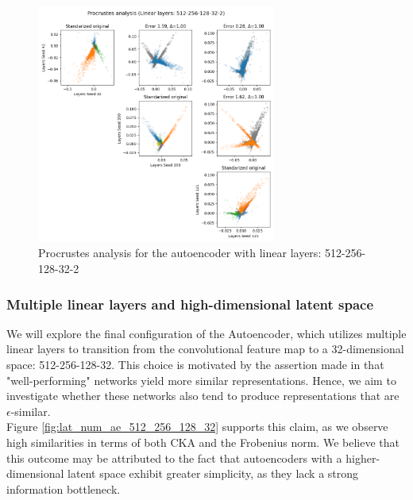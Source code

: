 \documentclass[../main.tex]{subfiles}
\begin{document}
\begin{figure}[ht!]
    \centering
    \includegraphics[width=0.7\textwidth]{figures/rs/sim_ae/procrustes_512-256-128-32-2__42_200_121.png} 
    \caption{Procrustes analysis for the autoencoder with linear layers: 512-256-128-32-2}
    \label{fig:proc_ae_512_256_128_32_2}
\end{figure}


\subsubsection*{Multiple linear layers and high-dimensional latent space}
We will explore the final configuration of the Autoencoder, which utilizes multiple linear layers to transition from the convolutional feature map to a 32-dimensional space: 512-256-128-32. This choice is motivated by the assertion made in \cite{kornblith_similarity_2019} that "well-performing" networks yield more similar representations. Hence, we aim to investigate whether these networks also tend to produce representations that are $\epsilon$-similar.\\

Figure \ref{fig:lat_num_ae_512_256_128_32} supports this claim, as we observe high similarities in terms of both CKA and the Frobenius norm. We believe that this outcome may be attributed to the fact that autoencoders with a higher-dimensional latent space exhibit greater simplicity, as they lack a strong information bottleneck.\\
\end{document}
